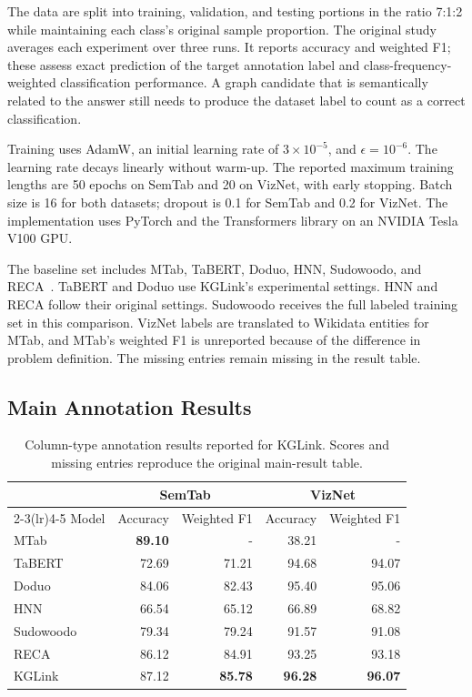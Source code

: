 The data are split into training, validation, and testing portions in the ratio 7:1:2 while maintaining each class's original sample proportion. The original study averages each experiment over three runs. It reports accuracy and weighted F1; these assess exact prediction of the target annotation label and class-frequency-weighted classification performance. A graph candidate that is semantically related to the answer still needs to produce the dataset label to count as a correct classification.

Training uses AdamW, an initial learning rate of $3\times10^{-5}$, and $\epsilon=10^{-6}$. The learning rate decays linearly without warm-up. The reported maximum training lengths are 50 epochs on SemTab and 20 on VizNet, with early stopping. Batch size is 16 for both datasets; dropout is 0.1 for SemTab and 0.2 for VizNet. The implementation uses PyTorch and the Transformers library on an NVIDIA Tesla V100 GPU.

The baseline set includes MTab, TaBERT, Doduo, HNN, Sudowoodo, and RECA~\cite{kglink-2021_mtab4wikidata,kglink-yin2020tabert,kglink-suhara2022annotating,kglink-chen2019learning,kglink-wang2022sudowoodo,kglink-sun2023reca}. TaBERT and Doduo use KGLink's experimental settings. HNN and RECA follow their original settings. Sudowoodo receives the full labeled training set in this comparison. VizNet labels are translated to Wikidata entities for MTab, and MTab's weighted F1 is unreported because of the difference in problem definition. The missing entries remain missing in the result table.

\subsection{Main Annotation Results}
\label{sec:kglink:main-results}

\begin{table}[tbp]
\centering
\caption{Column-type annotation results reported for KGLink. Scores and missing entries reproduce the original main-result table.}
\label{tab:kglink:main}
\begin{tabular}{lrrrr}
\toprule
&\multicolumn{2}{c}{SemTab}&\multicolumn{2}{c}{VizNet}\\
\cmidrule(lr){2-3}\cmidrule(lr){4-5}
Model&Accuracy&Weighted F1&Accuracy&Weighted F1\\
\midrule
MTab&\textbf{89.10}&-&38.21&-\\
TaBERT&72.69&71.21&94.68&94.07\\
Doduo&84.06&82.43&95.40&95.06\\
HNN&66.54&65.12&66.89&68.82\\
Sudowoodo&79.34&79.24&91.57&91.08\\
RECA&86.12&84.91&93.25&93.18\\
KGLink&87.12&\textbf{85.78}&\textbf{96.28}&\textbf{96.07}\\
\bottomrule
\end{tabular}
\end{table}

